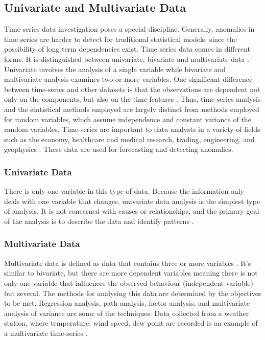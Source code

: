 \subsection{Univariate and Multivariate Data}
Time series data investigation poses a special discipline. Generally, anomalies in time series are harder to detect for traditional statistical models, since the possibility of long term dependencies exist. Time series data comes in different forms. It is distinguished between univariate, bivariate and multivariate data \parencite{pena2011}. Univariate involves the analysis of a single variable while bivariate and multivariate analysis examines two or more variables. One significant difference between time-series and other datasets is that the observations are dependent not only on the components, but also on the time features \parencite{Tsay2000}. Thus, time-series analysis and the statistical methods employed are largely distinct from methods employed for random variables, which assume independence and constant variance of the random variables. Time-series are important to data analysts in a variety of fields such as the economy, healthcare and medical research, trading, engineering, and geophysics . These data are used for forecasting and detecting anomalies.

\subsubsection{Univariate Data}
There is only one variable in this type of data. Because the information only deals with one variable that changes, univariate data analysis is the simplest type of analysis. It is not concerned with causes or relationships, and the primary goal of the analysis is to describe the data and identify patterns \parencite{pena2011}.


\subsubsection{Multivariate Data}
Multivariate data is defined as data that contains three or more variables \parencite{Olkin2001}. It's similar to bivariate, but there are more dependent variables meaning there is not only one variable that influences the observed behaviour (independent variable) but several. The methods for analysing this data are determined by the objectives to be met. Regression analysis, path analysis, factor analysis, and multivariate analysis of variance are some of the techniques. Data collected from a weather station, where temperature, wind speed, dew point are recorded is an example of a multivariate time-series \parencite{Singh2018}.

